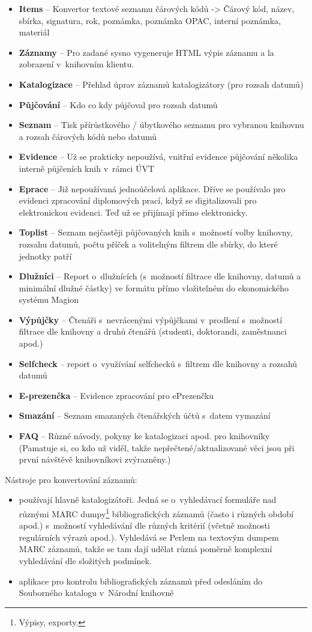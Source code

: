 \documentclass[
	11pt, oneside, printed, draft, 
	table,   %
	lof,     %
	lot     %
]{fithesis3}
\newcommand{\bold}[1]{\textbf{#1}}
\begin{document}
{\begin{itemize}
\item \bold{Items} – Konvertor textové seznamu čárových kódů -> Čárový kód, název, sbírka, signatura, rok, poznámka, poznámka OPAC, interní poznámka, materiál
\item \bold{Záznamy} – Pro zadané sysno vygeneruje HTML výpis záznamu a la zobrazení v~knihovním klientu.
\item \bold{Katalogizace} – Přehlad úprav záznamů katalogizátory (pro rozsah datumů)
\item \bold{Půjčování} – Kdo co kdy půjčoval pro rozsah datumů
\item \bold{Seznam} – Tisk přírůstkového / úbytkového seznamu pro vybranou knihovnu a rozsah čárových kódů nebo datumů
\item \bold{Evidence} – Už se prakticky nepoužívá, vnitřní evidence půjčování několika interně půjčeních knih v~rámci ÚVT
\item \bold{Eprace} – Již nepoužívaná jednoúčelová aplikace. Dříve se používalo pro evidenci zpracování diplomových prací, když se digitalizovali pro elektronickou evidenci. Teď už se přijímají přímo elektronicky.
\item \bold{Toplist} – Seznam nejčastěji půjčovaných knih s~možností volby knihovny, rozsahu datumů, počtu příček a volitelným filtrem dle sbírky, do které jednotky patří
\item \bold{Dlužníci} – Report o~dlužnících (s~možností filtrace dle knihovny, datumů a minimální dlužné částky) ve formátu přímo vložitelném do ekonomického systému Magion
\item \bold{Výpůjčky} – Čtenáři s~nevrácenými výpůjčkami v~prodlení s~možností filtrace dle knihovny a druhů čtenářů (studenti, doktorandi, zaměstnanci apod.)
\item \bold{Selfcheck} – report o~využívání selfchecků s~filtrem dle knihovny a rozsahů datumů
\item \bold{E-prezenčka} – Evidence zpracování pro ePrezenčku
\item \bold{Smazání} – Seznam smazaných čtenářských účtů s~datem vymazání
\item \bold{FAQ} – Různé návody, pokyny ke katalogizaci apod. pro knihovníky (Pamatuje si, co kdo už viděl, takže nepřečtené/aktualizované věci jsou při první návštěvě knihovníkovi zvýrazněny.)
\end{itemize}

Nástroje pro konvertování záznamů:

\begin{itemize}
\item používají hlavně katalogizátoři. Jedná se o~vyhledávací formuláře nad různými MARC dumpy\footnote{Výpisy, exporty.} bibliografických záznamů (často i různých období apod.) s~možností vyhledávání dle různých kritérií (včetně možnosti regulárních výrazů apod.). Vyhledává se Perlem na textovým dumpem MARC záznamů, takže se tam dají udělat různá poměrně komplexní vyhledávání dle složitých podmínek. 
\item aplikace pro kontrolu bibliografických záznamů před odesláním do Souborného katalogu v~Národní knihovně
\end{itemize}

}
\end{document}
